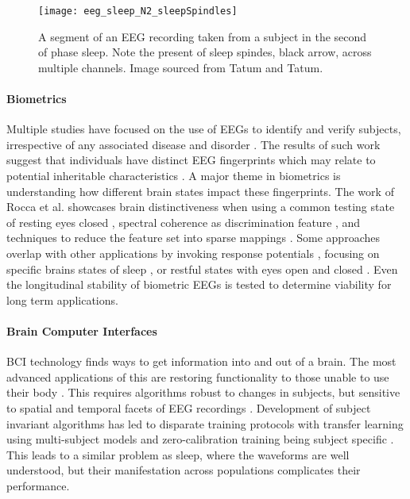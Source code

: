 \begin{figure}[h]
\centering
\texttt{[image: eeg\_sleep\_N2\_sleepSpindles]}
\caption[Example of sleeping EEG with sleep spindles.]{A segment of an \ac{EEG} recording taken from a subject in the second of phase sleep. Note the present of sleep spindes, black arrow, across multiple channels. Image sourced from Tatum and Tatum\cite{Tatum2014}.}
\label{fig:sleepExample}
\end{figure}

\paragraph*{Biometrics}
Multiple studies have focused on the use of \acp{EEG} to identify and verify subjects, irrespective of any associated disease and disorder \cite{DelPozo-Banos2014a}. The results of such work suggest that individuals have distinct \ac{EEG} fingerprints \cite{Tangkraingkij2010,Stassen1988,Doppelmayr1998a} which may relate to potential inheritable characteristics \cite{Stassen1988,VanBeijsterveldt2002}. A major theme in biometrics is understanding how different brain states impact these fingerprints. The work of Rocca et al. showcases brain distinctiveness when using a common testing state of resting eyes closed \cite{Rocca2012}, spectral coherence as discrimination feature \cite{Rocca2014}, and techniques to reduce the feature set into sparse mappings \cite{Rocca2013}. Some approaches overlap with other applications by invoking response potentials \cite{Brigham2010}, focusing on specific brains states of sleep \cite{DeGennaro2008}, or restful states with eyes open and closed \cite{Fraschini2015}. Even the longitudinal stability of biometric \acp{EEG} is tested \cite{Napflin2007} to determine viability for long term applications.

\paragraph*{Brain Computer Interfaces}
\ac{BCI} technology finds ways to get information into and out of a brain. The most advanced applications of this are restoring functionality to those unable to use their body \cite{Ajiboye2017,Gouy-Pailler2008a}. This requires algorithms robust to changes in subjects, but sensitive to spatial and temporal facets of \ac{EEG} recordings \cite{Kindermans2014b,Blankertz2007a}. Development of subject invariant algorithms has led to disparate training protocols with transfer learning using multi-subject models \cite{Lotte2010a} and zero-calibration training being subject specific \cite{Kindermans2014}. This leads to a similar problem as sleep, where the waveforms are well understood, but their manifestation across populations complicates their performance.

